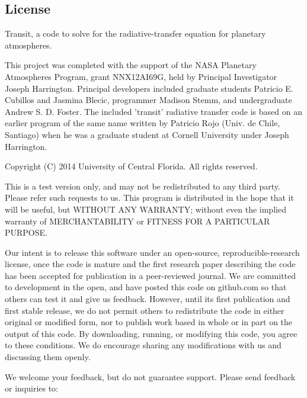 \documentclass[letterpaper, 12pt]{article}
\begin{document}
\pagebreak
\subsection{License}

Transit, a code to solve for the radiative-transfer equation for
planetary atmospheres. \newline

This project was completed with the support of the NASA Planetary
Atmospheres Program, grant NNX12AI69G, held by Principal Investigator
Joseph Harrington. Principal developers included graduate students
Patricio E. Cubillos and Jasmina Blecic, programmer Madison Stemm, and
undergraduate Andrew S. D. Foster.  The included 'transit' radiative
transfer code is based on an earlier program of the same name written
by Patricio Rojo (Univ. de Chile, Santiago) when he was a graduate
student at Cornell University under Joseph Harrington. \newline

Copyright (C) 2014 University of Central Florida.  All rights
reserved. \newline

This is a test version only, and may not be redistributed to any third
party. Please refer such requests to us. This program is distributed
in the hope that it will be useful, but WITHOUT ANY WARRANTY; without
even the implied warranty of MERCHANTABILITY or FITNESS FOR A
PARTICULAR PURPOSE. \newline

Our intent is to release this software under an open-source,
reproducible-research license, once the code is mature and the first
research paper describing the code has been accepted for publication
in a peer-reviewed journal. We are committed to development in the
open, and have posted this code on github.com so that others can test
it and give us feedback. However, until its first publication and
first stable release, we do not permit others to redistribute the code
in either original or modified form, nor to publish work based in
whole or in part on the output of this code. By downloading, running,
or modifying this code, you agree to these conditions. We do encourage
sharing any modifications with us and discussing them openly. \newline

\noindent We welcome your feedback, but do not guarantee
support. Please send feedback or inquiries to: \newline
\end{document}
